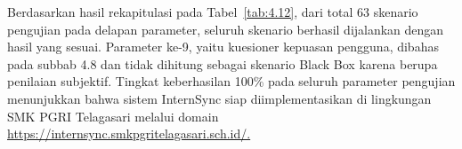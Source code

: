 Berdasarkan hasil rekapitulasi pada Tabel~\ref{tab:4.12}, dari total 63 skenario pengujian pada delapan parameter, seluruh skenario berhasil dijalankan dengan hasil yang sesuai. Parameter ke-9, yaitu kuesioner kepuasan pengguna, dibahas pada subbab 4.8 dan tidak dihitung sebagai skenario Black Box karena berupa penilaian subjektif. Tingkat keberhasilan 100\% pada seluruh parameter pengujian menunjukkan bahwa sistem InternSync siap diimplementasikan di lingkungan SMK PGRI Telagasari melalui domain \url{https://internsync.smkpgritelagasari.sch.id/.}
